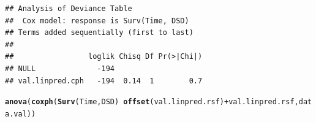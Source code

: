 \documentclass{article}\usepackage[]{graphicx}\usepackage[]{color}
\makeatletter
\newcommand{\hlopt}[1]{\textcolor[rgb]{0,0,0}{#1}}%
\newcommand{\hlstd}[1]{\textcolor[rgb]{0.345,0.345,0.345}{#1}}%
\newcommand{\hlkwd}[1]{\textcolor[rgb]{0.737,0.353,0.396}{\textbf{#1}}}%
\newenvironment{kframe}{%
 \def\at@end@of@kframe{}%
 \ifinner\ifhmode%
  \def\at@end@of@kframe{\end{minipage}}%
  \begin{minipage}{\columnwidth}%
 \fi\fi%
 \def\FrameCommand##1{\hskip\@totalleftmargin \hskip-\fboxsep
 \colorbox{shadecolor}{##1}\hskip-\fboxsep
     \hskip-\linewidth \hskip-\@totalleftmargin \hskip\columnwidth}%
 \MakeFramed {\advance\hsize-\width
   \@totalleftmargin\z@ \linewidth\hsize
   \@setminipage}}%
 {\par\unskip\endMakeFramed%
 \at@end@of@kframe}
\newenvironment{knitrout}{}{} %
\makeatother
\begin{document}
\begin{knitrout}
\begin{kframe}
\begin{alltt}
\end{alltt}
\begin{verbatim}
## Analysis of Deviance Table
##  Cox model: response is Surv(Time, DSD)
## Terms added sequentially (first to last)
## 
##                 loglik Chisq Df Pr(>|Chi|)
## NULL              -194                    
## val.linpred.cph   -194  0.14  1        0.7
\end{verbatim}
\begin{alltt}
\hlkwd{anova}\hlstd{(}\hlkwd{coxph}\hlstd{(}\hlkwd{Surv}\hlstd{(Time, DSD)} \hlopt{~} \hlkwd{offset}\hlstd{(val.linpred.rsf)} \hlopt{+} \hlstd{val.linpred.rsf, data.val))}
\end{alltt}


{\ttfamily\noindent\color{warningcolor}{\#\# Warning in fitter(X, Y, strats, offset, init, control, weights = weights, : Ran out of iterations and did not converge}}


\end{kframe}
\end{knitrout}
\end{document}
